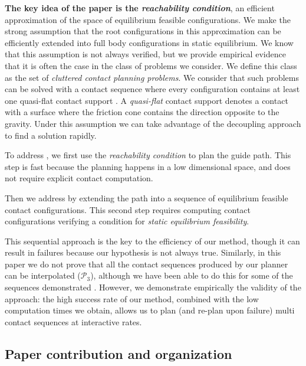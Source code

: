 \textbf{The key idea of the paper is the \textit{reachability condition}}, an efficient approximation of the space of \gls{equilibrium feasible} configurations.
We make the strong assumption that the root configurations in this approximation can be efficiently extended into full body configurations in static equilibrium.
We know that this assumption is not always verified, but we provide empirical evidence that it is often
the case in the class of problems we consider. We define this class as the set of \textit{\gls{cluttered} contact planning problems}.
We consider that such problems can be solved with a contact sequence 
where every configuration contains at least one \gls{quasi-flat} contact support \citep{Prete2016}. A \textit{quasi-flat} contact support denotes a contact
with a surface where the friction cone contains the direction opposite to the gravity. 
Under this assumption we can take advantage of the decoupling approach to find a solution rapidly.

To address \Pa, we first use the \textit{reachability condition} to plan the guide path. This step is fast because the planning happens
in a low dimensional space, and does not require explicit contact computation.

Then we address \Pb by extending the path into a sequence of \gls{equilibrium feasible} contact configurations.
This second step requires computing contact configurations verifying a condition for \textit{static equilibrium feasibility}.

This sequential approach is the key to the efficiency of our method, though it
can result in failures because our hypothesis is not always true. Similarly, in this paper we do not 
prove that all the contact sequences produced by our planner can be interpolated ($\mathcal{P}_3$), although we have been able to do this
for some of the sequences demonstrated \citep{Carpentier2016}. However, we demonstrate empirically the validity of the approach: the high success rate of our method, combined with the low computation times we obtain, allows us to plan (and re-plan upon failure) multi contact sequences at \gls{interactive} rates.

\subsection{Paper contribution and organization}


